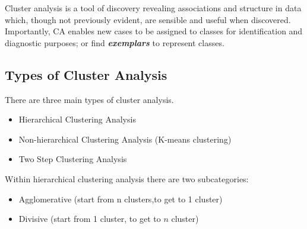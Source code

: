 Cluster analysis is a tool of discovery revealing associations and structure in data which, though not previously
evident, are sensible and useful when discovered. Importantly, CA enables new
cases to be assigned to classes for identification and diagnostic purposes; or find \textbf{\textit{exemplars}}
to represent classes.
\subsection{Types of Cluster Analysis}
There are three main types of cluster analysis.
\begin{itemize}
\item Hierarchical Clustering Analysis
\item Non-hierarchical Clustering Analysis (K-means clustering)
\item Two Step Clustering Analysis
\end{itemize}
Within hierarchical clustering analysis there are two subcategories: 
\begin{itemize}
\item Agglomerative (start from n clusters,to get to 1 cluster)
\item Divisive (start from 1 cluster, to get to $n$ cluster)
\end{itemize}

